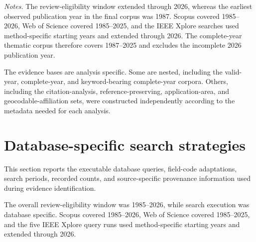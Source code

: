 \documentclass[12pt]{article}
\numberwithin{equation}{section}
\begin{document}
\normalsize

\noindent
\textit{Notes.}
The review-eligibility window extended through 2026, whereas the
earliest observed publication year in the final corpus was 1987.
Scopus covered 1985--2026, Web of Science covered 1985--2025,
and the IEEE Xplore searches used method-specific starting years
and extended through 2026. The complete-year thematic corpus
therefore covers 1987--2025 and excludes the incomplete 2026
publication year.

The evidence bases are analysis specific. Some are nested, including
the valid-year, complete-year, and keyword-bearing complete-year
corpora. Others, including the citation-analysis, reference-preserving,
application-area, and geocodable-affiliation sets, were constructed
independently according to the metadata needed for each analysis.

\FloatBarrier
\clearpage


\section{Database-specific search strategies}
\label{sec:supp-search}

This section reports the executable database queries, field-code
adaptations, search periods, recorded counts, and source-specific
provenance information used during evidence identification.

The overall review-eligibility window was 1985--2026, while search
execution was database specific. Scopus covered 1985--2026,
Web of Science covered 1985--2025, and the five IEEE Xplore query
runs used method-specific starting years and extended through 2026.
\end{document}
